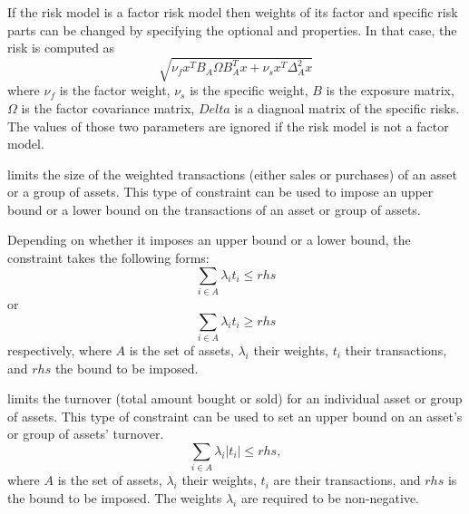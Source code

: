    If the risk model is a factor risk model then weights of its factor and specific risk parts 
   can be changed by specifying the optional  and  properties. 
   In that case, the risk is computed as 
   \[
       \sqrt{\nu_f x^T B_A \Omega B^T_A x + \nu_s x^T \Delta^2_A x}
   \]
   where $\nu_f$ is the factor weight, $\nu_s$ is the specific weight,
   $B$ is the exposure matrix, $\Omega$ is the factor covariance matrix,
   $Delta$ is a diagnoal matrix of the specific risks.
   The values of those two parameters are ignored if the risk model is not a factor model.    

   limits the size of the weighted transactions (either sales or purchases) of an asset or a group of assets. 
   This type of constraint can be used to impose an upper bound or a lower bound on the transactions of an asset or group of assets. 

   Depending on whether it imposes an upper bound or a lower bound, the constraint takes the following forms: 
   \[
       \sum_{i\in A} \lambda_i t_i \le rhs
   \]
   or
   \[
       \sum_{i\in A} \lambda_i t_i \ge rhs
   \]
   respectively, where $A$ is the set of assets, 
   $\lambda_i$ their weights, $t_i$ their transactions, and $rhs$ the bound to be imposed.

   limits the turnover (total amount bought or sold) for an individual asset or group of assets. 
   This type of constraint can be used to set an upper bound on an asset's or group of assets' turnover. 
   \[
       \sum_{i\in A} \lambda_i|t_i|\le rhs,
   \]
   where $A$ is the set of assets, $\lambda_i$ their weights, $t_i$ are their transactions, 
   and $rhs$ is the bound to be imposed. 
   The weights $\lambda_i$ are required to be non-negative. 


